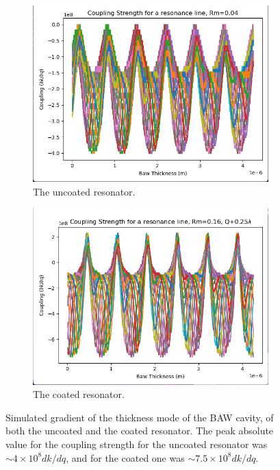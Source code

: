 \documentclass[aps,  
                a4paper, 
                amsmath, 
                amssymb, 
                preprint,
                tightenlines,  
                amsfonts,
                nofootinbib,
                onecolumn,
                titlepage,
                10pt
            ]{revtex4-2}
\begin{document}
    \begin{figure}
        \centering
        \centering
        \begin{subfigure}[b]{0.65\textwidth}
            \includegraphics[width=\textwidth]{img/0.04-coupling.png}
            \caption{The uncoated resonator.}
            \label{fig:sim-transmission-dmim}
        \end{subfigure}
        \begin{subfigure}[b]{0.65\textwidth}
            \includegraphics[width=\textwidth]{img/0.16-coupling.png}
            \caption{The coated resonator.}
            \label{fig:exp-transmission-dmim}
        \end{subfigure}
        \caption{Simulated gradient of the thickness mode of the BAW cavity, of both the uncoated and the coated resonator. The peak absolute value for the coupling strength for the uncoated resonator was $\sim4\times10^8 dk/dq$, and for the coated one was $\sim7.5\times10^8 dk/dq$.}
        \label{fig:gradient-dmim}
    \end{figure}
\end{document}

